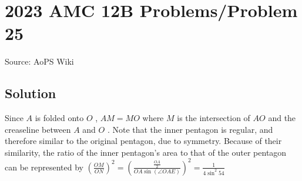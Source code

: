 \documentclass[12pt]{article}
\begin{document}
\section*{{2023 AMC 12B Problems/Problem 25}}
Source: AoPS Wiki

\subsection*{Solution}
Since $A$ is folded onto $O$ , $AM = MO$ where $M$ is the intersection of $AO$ and the creaseline between $A$ and $O$ . Note that the inner pentagon is regular, and therefore similar to the original pentagon, due to symmetry. Because of their similarity, the ratio of the inner pentagon's area to that of the outer pentagon can be represented by $\left(\frac{OM}{ON}\right)^{2} = \left(\frac{\frac{OA}{2}}{OA\sin (\angle OAE)}\right)^{2} = \frac{1}{4\sin^{2}54}$
\end{document}
